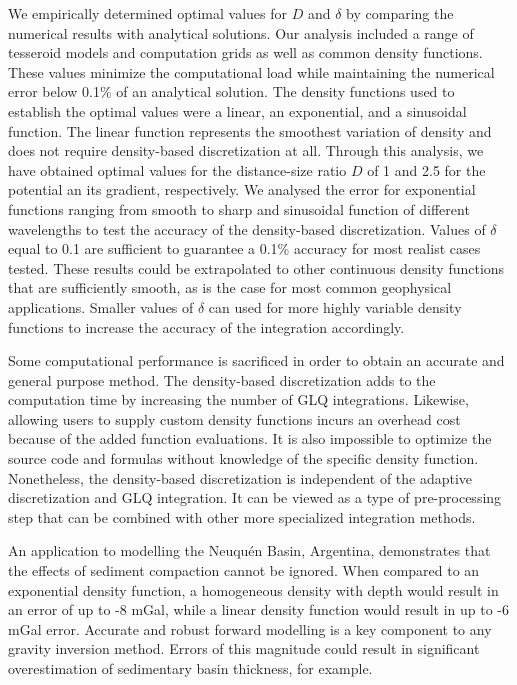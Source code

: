 \documentclass[extra, referee]{gji}
\begin{document}
We empirically determined optimal values for $D$ and $\delta$ by comparing the numerical
results with analytical solutions.
Our analysis included a range of tesseroid models and computation grids as well as
common density functions.
These values minimize the computational load while maintaining the numerical error below
0.1\% of an analytical solution.
The density functions used to establish the optimal values were a linear, an
exponential, and a sinusoidal function.
The linear function represents the smoothest variation of density and does not require
density-based discretization at all.
Through this analysis, we have obtained optimal values for the distance-size ratio $D$
of 1 and 2.5 for the potential an its gradient, respectively.
We analysed the error for exponential functions ranging from smooth to sharp and
sinusoidal function of different wavelengths to test the accuracy of the density-based
discretization.
Values of $\delta$ equal to 0.1 are sufficient to guarantee a 0.1\% accuracy for most
realist cases tested.
These results could be extrapolated to other continuous density functions that are
sufficiently smooth, as is the case for most common geophysical applications.
Smaller values of $\delta$ can used for more highly variable density functions to
increase the accuracy of the integration accordingly.

Some computational performance is sacrificed in order to obtain an accurate and general
purpose method.
The density-based discretization adds to the computation time by increasing
the number of GLQ integrations.
Likewise, allowing users to supply custom density functions incurs an overhead cost
because of the added function evaluations.
It is also impossible to optimize the source code and formulas without knowledge of the
specific density function.
Nonetheless, the density-based discretization is independent of the adaptive
discretization and GLQ integration.
It can be viewed as a type of pre-processing step that can be combined with other more
specialized integration methods.

An application to modelling the Neuqu\'en Basin, Argentina, demonstrates that the
effects of sediment compaction cannot be ignored.
When compared to an exponential density function, a homogeneous density with depth would
result in an error of up to -8 mGal, while a linear density function would result in up
to -6 mGal error.
Accurate and robust forward modelling is a key component to any gravity inversion
method.
Errors of this magnitude could result in significant overestimation of sedimentary
basin thickness, for example.
\end{document}
